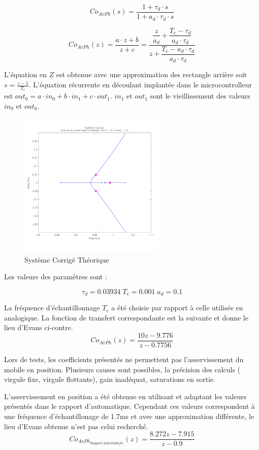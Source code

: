 \documentclass[11pt, french]{article} %
\begin{document}
\[Co_{AvPh}(s)=\dfrac{1+ \tau_d \cdot s}{1 + a_d \cdot \tau_d \cdot s} \]

\[Co_{AvPh}(z)=\dfrac{a \cdot z + b}{z + c}=\dfrac{\dfrac{z}{a_d}+\dfrac{T_e-\tau_d}{a_d \cdot \tau_d} }{z+\dfrac{T_e-a_d \cdot \tau_d}{a_d \cdot \tau_d}}\] 

L'équation en $Z$ est obtenue avec une approximation des rectangle arrière soit $s=\frac{z-1}{T_e}$. L'équation récurrente en découlant implantée dans le microcontrolleur est $out_0=a \cdot in_0 + b \cdot in_1 + c \cdot out_1$. $in_1$ et $out_1$ sont le vieillissement des valeurs $in_0$ et $out_0$.

\begin{figure}

	\includegraphics[width = 7cm,trim=0 1.4cm 0 0.7cm ,clip=true]
					{SolutionNumerique/SystemeCorrigeThorique.pdf}
	\caption{Système Corrigé Théorique}
	\vspace{1cm}
\end{figure}
Les valeurs des paramètres sont :

\[\tau_d=0.03934 \; T_e=0.001 \; a_d=0.1\]

La fréquence d'échantillonnage $T_e$ a été choisie par rapport à celle utilisée en analogique. La fonction de transfert correspondante est la suivante et donne le lieu d'Evans ci-contre.
\[Co_{AvPh}(z)=\dfrac{10 z - 9.776}{z -0.7756}\]

Lors de tests, les coefficients présentés ne permettent pas l'asservissement du mobile en position. Plusieurs causes sont possibles, la précision des calculs ( virgule fixe, virgule flottante), gain inadéquat, saturations en sortie.

L'asservissement en position a été obtenue en utilisant et adaptant les valeurs présentés dans le rapport d'automatique. Cependant ces valeurs correspondent à une fréquence d'échantillonage de 1.7ms et avec une approximation différente, le lieu d'Evans obtenue n'est pas celui recherché.
\[  Co_{AvPh_{Rapport Auto Modifie}}(z) = \dfrac {8.272z - 7.915} {z - 0.9} \]
\end{document}

